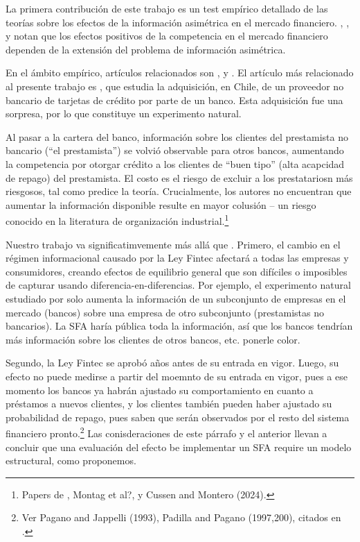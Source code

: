 \documentclass[11pt]{article}
\theoremstyle{plain}
\theoremstyle{plain}
\begin{document}
\vspace{2cm} 


La primera contribución de este trabajo es un test empírico detallado de las teorías sobre los efectos de la información asimétrica en el mercado financiero. \textcite{sharpe_asymmetric_1990}, \textcite{petersen_effect_1995}, \textcite{dellariccia_adverse_1999} y \textcite{dellariccia_information_2004} notan que los efectos positivos de la competencia en el mercado financiero dependen de la extensión del problema de información asimétrica.

En el ámbito empírico, artículos relacionados son \textcite{petersen_benefits_1994,petersen_effect_1995}, \textcite{liberman_equilibrium_2018} y \textcite{foley_effects_2022}. El artículo más relacionado al presente trabajo es \textcite{foley_effects_2022}, que estudia la adquisición, en Chile, de un proveedor no bancario de tarjetas de crédito por parte de un banco. Esta adquisición fue una sorpresa, por lo que constituye un experimento natural. 

Al pasar a la cartera del banco, información sobre los clientes del prestamista no bancario (``el prestamista'') se volvió observable para otros bancos, aumentando la competencia por otorgar crédito a los clientes de ``buen tipo'' (alta acapcidad de repago) del prestamista. El costo es el riesgo de excluir a los prestatariosn más riesgosos, tal como predice la teoría. Crucialmente, los autores no encuentran que aumentar la información disponible resulte en mayor colusión -- un riesgo conocido en la literatura de organización industrial.\footnote{Papers de \textcite{green_noncooperative_1984}, Montag et al?, y Cussen and Montero (2024).}

Nuestro trabajo va significatimvemente más allá que \textcite{foley_effects_2022}. Primero, el cambio en el régimen informacional causado por la Ley Fintec afectará a todas las empresas y consumidores, creando efectos de equilibrio general que son difíciles o imposibles de capturar usando diferencia-en-diferencias. Por ejemplo, el experimento natural estudiado por \textcite{foley_effects_2022} solo aumenta la información de un subconjunto de empresas en el mercado (bancos) sobre una empresa de otro subconjunto (prestamistas no bancarios). La SFA haría pública toda la información, así que los bancos tendrían más información sobre los clientes de otros bancos, etc. ponerle color. 

Segundo, la Ley Fintec se aprobó años antes de su entrada en vigor. Luego, su efecto no puede medirse a partir del moemnto de su entrada en vigor, pues a ese momento los bancos ya habrán ajustado su comportamiento en cuanto a préstamos a nuevos clientes, y los clientes también pueden haber ajustado su probabilidad de repago, pues saben que serán observados por el resto del sistema financiero pronto.\footnote{Ver Pagano and Jappelli (1993), Padilla and Pagano (1997,200), citados en \textcite{foley_effects_2022}.} Las conisderaciones de este párrafo y el anterior llevan a concluir que una evaluación del efecto be implementar un SFA require un modelo estructural, como proponemos.
\end{document}
